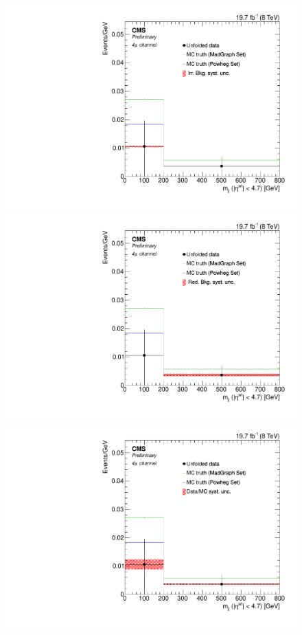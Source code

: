 \begin{figure}[hbtp]
\begin{center}
    \includegraphics[width=0.8\cmsFigWidth]{Figures/Unfolding/Systematics/ZZTo4m_Mjj_IrrBkg_Mad_fr}
    \includegraphics[width=0.8\cmsFigWidth]{Figures/Unfolding/Systematics/ZZTo4m_Mjj_RedBkg_Mad_fr}     
    \includegraphics[width=0.8\cmsFigWidth]{Figures/Unfolding/Systematics/ZZTo4m_Mjj_UnfDataOverGenMC_Mad_fr}     

\end{center}
\end{figure}
